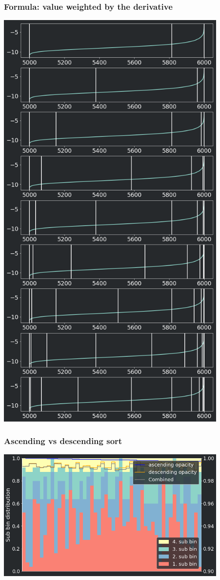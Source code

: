 \frame
{
	\frametitle{Formula: value weighted by the derivative}
	\centering
	\includegraphics[width=115mm]{images/smart_sub_bins}
}
\frame
{
	\frametitle{Ascending vs descending sort}
	\centering
	\includegraphics[width=115mm]{images/ascending_descending}
}
\backupend
